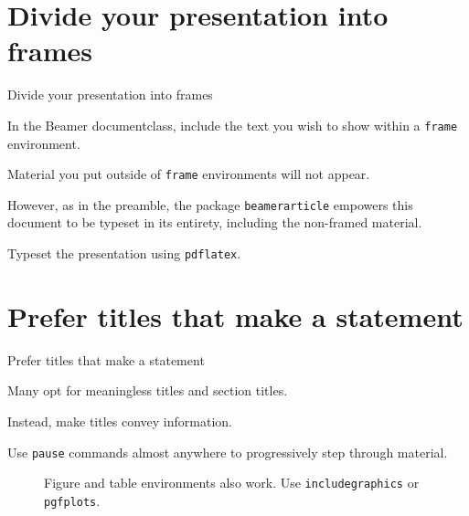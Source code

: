 \documentclass[ignorenonframetext,12pt]{beamer}
\begin{document}
\section{Divide your presentation into frames}
\begin{frame}{Divide your presentation into frames}

				In the Beamer documentclass, include the text you wish to show within a \texttt{frame} environment.

				Material you put outside of \texttt{frame} environments will not appear.

				However, as in the preamble, the package \texttt{beamerarticle} empowers this document to be typeset in its entirety, including the non-framed material.

				Typeset the presentation using \texttt{pdflatex}.
\end{frame}



\section{Prefer titles that make a statement}
\begin{frame}{Prefer titles that make a statement}

				Many opt for meaningless titles and section titles.  

				Instead, make titles convey information.

				\pause

				Use \texttt{pause} commands almost anywhere to progressively step through material.

				\pause

				\begin{figure}
								\centering
								\caption{Figure and table environments also work.
								Use \texttt{includegraphics} or \texttt{pgfplots}.}
				\end{figure}

\end{frame}
\end{document}
